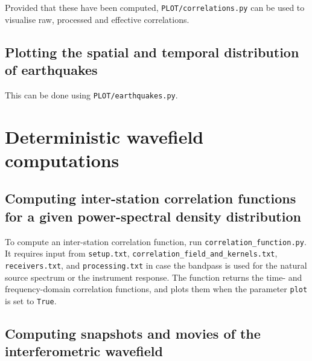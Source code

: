 Provided that these have been computed, \texttt{PLOT/correlations.py} can be used to visualise raw, processed and effective correlations.

\subsection{Plotting the spatial and temporal distribution of earthquakes}

This can be done using \texttt{PLOT/earthquakes.py}.

\section{Deterministic wavefield computations}

\subsection{Computing inter-station correlation functions for a given power-spectral density distribution}

To compute an inter-station correlation function, run \texttt{correlation\_function.py}. It requires input from \texttt{setup.txt}, \texttt{correlation\_field\_and\_kernels.txt}, \texttt{receivers.txt}, and \texttt{processing.txt} in case the bandpass is used for the natural source spectrum or the instrument response. The function returns the time- and frequency-domain correlation functions, and plots them when the parameter \texttt{plot} is set to \texttt{True}.

\subsection{Computing snapshots and movies of the interferometric wavefield}

